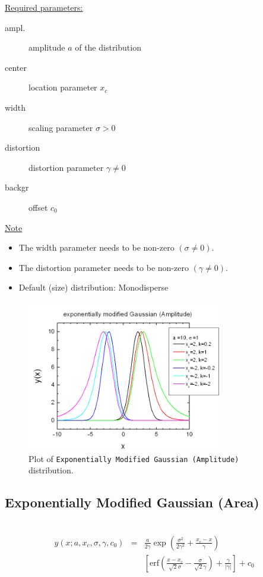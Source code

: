 \underline{Required parameters:}
\begin{description}
    \item[ampl.] amplitude $a$ of the distribution
    \item[center] location parameter $x_c$
    \item[width] scaling parameter $\sigma> 0$
    \item[distortion] distortion parameter $\gamma\neq 0$
    \item[backgr] offset $c_0$
\end{description}

\underline{Note}
\begin{itemize}
  \item The width parameter needs to be non-zero $(\sigma\neq 0)$.
  \item The distortion parameter needs to be non-zero $(\gamma \neq 0)$.
  \item Default (size) distribution: Monodisperse
\end{itemize}
\begin{figure}[htb]
\begin{center}
\includegraphics[width=0.768\textwidth]{EMGAmplitude.png}
\end{center}
\caption{Plot of \texttt{Exponentially Modified Gaussian (Amplitude)} distribution.}
\label{fig:EMGAmplitude}
\end{figure}

\clearpage
\subsection{Exponentially Modified Gaussian (Area)} ~\\
\label{sec:ExponentiallyModifiedGaussianArea}
\begin{eqnarray}
y(x;a,x_c,\sigma,\gamma,c_0) & = &
\frac{a}{2\gamma}
\exp\left(\frac{\sigma^2}{2\gamma^2}+\frac{x_c-x}{\gamma}\right) \nonumber \\
& & \left[\mathrm{erf}\left(\frac{x-x_c}{\sqrt{2}\sigma}-\frac{\sigma}{\sqrt{2}\gamma}\right)+\frac{\gamma}{| \gamma |}\right]
+c_0
\end{eqnarray}

